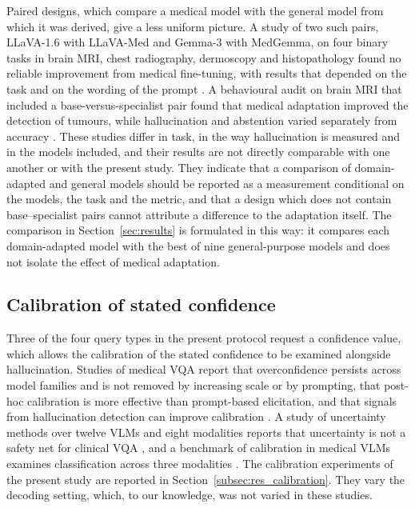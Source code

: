 Paired designs, which compare a medical model with the general model from which it was derived, give a less uniform picture. A study of two such pairs, LLaVA-1.6 with LLaVA-Med and Gemma-3 with MedGemma, on four binary tasks in brain MRI, chest radiography, dermoscopy and histopathology found no reliable improvement from medical fine-tuning, with results that depended on the task and on the wording of the prompt \citep{mclaughlin2026knowledge}. A behavioural audit on brain MRI that included a base-versus-specialist pair found that medical adaptation improved the detection of tumours, while hallucination and abstention varied separately from accuracy \citep{sabbaghziarani2026confident}. These studies differ in task, in the way hallucination is measured and in the models included, and their results are not directly comparable with one another or with the present study. They indicate that a comparison of domain-adapted and general models should be reported as a measurement conditional on the models, the task and the metric, and that a design which does not contain base--specialist pairs cannot attribute a difference to the adaptation itself. The comparison in Section~\ref{sec:results} is formulated in this way: it compares each domain-adapted model with the best of nine general-purpose models and does not isolate the effect of medical adaptation.

\subsection{Calibration of stated confidence}
\label{subsec:rw_calibration}

Three of the four query types in the present protocol request a confidence value, which allows the calibration of the stated confidence to be examined alongside hallucination. Studies of medical VQA report that overconfidence persists across model families and is not removed by increasing scale or by prompting, that post-hoc calibration is more effective than prompt-based elicitation, and that signals from hallucination detection can improve calibration \citep{byun2026overconfidence}. A study of uncertainty methods over twelve VLMs and eight modalities reports that uncertainty is not a safety net for clinical VQA \citep{fazla2026uncertainty}, and a benchmark of calibration in medical VLMs examines classification across three modalities \citep{sharifdeen2026mvcbench}. The calibration experiments of the present study are reported in Section~\ref{subsec:res_calibration}. They vary the decoding setting, which, to our knowledge, was not varied in these studies.

